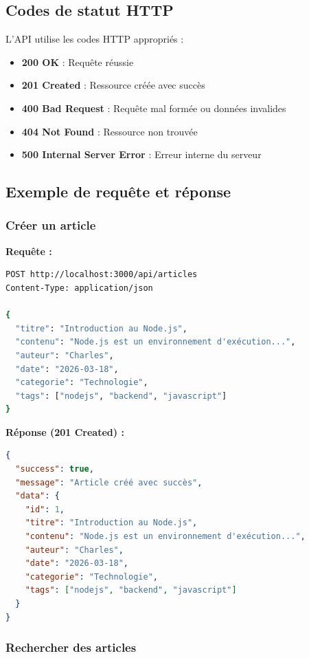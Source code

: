 \documentclass[12pt,a4paper]{article}
\begin{document}
\subsection{Codes de statut HTTP}

L'API utilise les codes HTTP appropriés :

\begin{itemize}
    \item \textbf{200 OK} : Requête réussie
    \item \textbf{201 Created} : Ressource créée avec succès
    \item \textbf{400 Bad Request} : Requête mal formée ou données invalides
    \item \textbf{404 Not Found} : Ressource non trouvée
    \item \textbf{500 Internal Server Error} : Erreur interne du serveur
\end{itemize}

\subsection{Exemple de requête et réponse}

\subsubsection{Créer un article}

\textbf{Requête :}
\begin{lstlisting}[language=bash]
POST http://localhost:3000/api/articles
Content-Type: application/json

{
  "titre": "Introduction au Node.js",
  "contenu": "Node.js est un environnement d'exécution...",
  "auteur": "Charles",
  "date": "2026-03-18",
  "categorie": "Technologie",
  "tags": ["nodejs", "backend", "javascript"]
}
\end{lstlisting}

\textbf{Réponse (201 Created) :}
\begin{lstlisting}[language=json]
{
  "success": true,
  "message": "Article créé avec succès",
  "data": {
    "id": 1,
    "titre": "Introduction au Node.js",
    "contenu": "Node.js est un environnement d'exécution...",
    "auteur": "Charles",
    "date": "2026-03-18",
    "categorie": "Technologie",
    "tags": ["nodejs", "backend", "javascript"]
  }
}
\end{lstlisting}

\subsubsection{Rechercher des articles}
\end{document}
